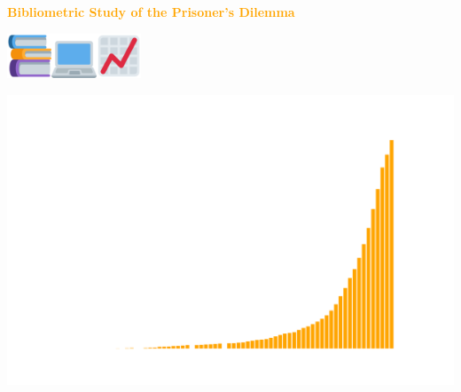 \documentclass{beamer}
\begin{document}
\begin{frame}
    \begin{center}
    \textcolor{orange}{\large{\textbf{Bibliometric Study of the Prisoner's Dilemma}}} \vspace{1cm}
    
    \includegraphics[width=0.10\textwidth]{static/books.png}\hspace{2pt}\includegraphics[width=0.10\textwidth]{static/pc.png}\hspace{2pt}\includegraphics[width=0.10\textwidth]{static/chart.png}
    \end{center}
\end{frame}

\begin{frame}
    \begin{center}
    
    \end{center}
\end{frame}

\begin{frame}
    \begin{center}
    
    \end{center}
\end{frame}

\begin{frame}
    \begin{center}
        \includegraphics[width=\textwidth]{static/articles.png}
    \end{center}
\end{frame}
\end{document}
